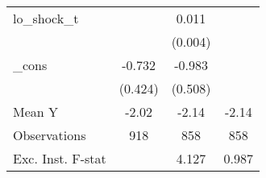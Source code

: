 {\begin{tabular}{l*{3}{c}}
\addlinespace
lo\_shock\_t  &                     &       0.011\sym{***}&                     \\
            &                     &     (0.004)         &                     \\
\addlinespace
\_cons      &      -0.732\sym{*}  &      -0.983\sym{*}  &                     \\
            &     (0.424)         &     (0.508)         &                     \\
\midrule
Mean Y      &       -2.02         &       -2.14         &       -2.14         \\
Observations&         918         &         858         &         858         \\
Exc. Inst. F-stat&                     &       4.127         &       0.987         \\
\bottomrule
\end{tabular}
}
